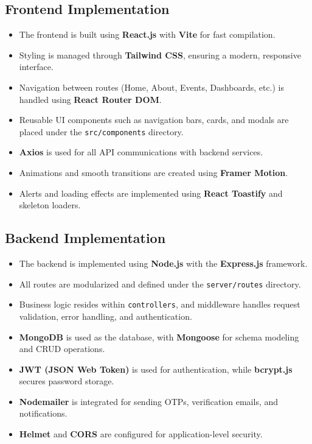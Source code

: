 \documentclass[12pt,a4paper]{report}
\begin{document}
\subsection*{Frontend Implementation}
\begin{itemize}
    \item The frontend is built using \textbf{React.js} with \textbf{Vite} for fast compilation.
    \item Styling is managed through \textbf{Tailwind CSS}, ensuring a modern, responsive interface.
    \item Navigation between routes (Home, About, Events, Dashboards, etc.) is handled using \textbf{React Router DOM}.
    \item Reusable UI components such as navigation bars, cards, and modals are placed under the \texttt{src/components} directory.
    \item \textbf{Axios} is used for all API communications with backend services.
    \item Animations and smooth transitions are created using \textbf{Framer Motion}.
    \item Alerts and loading effects are implemented using \textbf{React Toastify} and skeleton loaders.
\end{itemize}

\subsection*{Backend Implementation}
\begin{itemize}
    \item The backend is implemented using \textbf{Node.js} with the \textbf{Express.js} framework.
    \item All routes are modularized and defined under the \texttt{server/routes} directory.
    \item Business logic resides within \texttt{controllers}, and middleware handles request validation, error handling, and authentication.
    \item \textbf{MongoDB} is used as the database, with \textbf{Mongoose} for schema modeling and CRUD operations.
    \item \textbf{JWT (JSON Web Token)} is used for authentication, while \textbf{bcrypt.js} secures password storage.
    \item \textbf{Nodemailer} is integrated for sending OTPs, verification emails, and notifications.
    \item \textbf{Helmet} and \textbf{CORS} are configured for application-level security.
\end{itemize}
\end{document}
